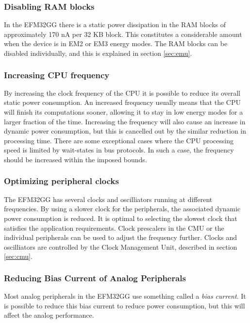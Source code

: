 \subsubsection{Disabling RAM blocks}
In the EFM32GG there is a static power dissipation in the RAM blocks of approximately 170 nA per 32 KB block. This constitutes a considerable amount when the device is in EM2 or EM3 energy modes. The RAM blocks can be disabled individually, and this is explained in section \ref{sec:emu}.\cite{efm32-energy-optimization}


\subsubsection{Increasing CPU frequency}
By increasing the clock frequency of the CPU it is possible to reduce its overall static power consumption. An increased frequency usually means that the CPU will finish its computations sooner, allowing it to stay in low energy modes for a larger fraction of the time. Increasing the frequency will also cause an increase in dynamic power consumption, but this is cancelled out by the similar reduction in processing time. There are some exceptional cases where the CPU processing speed is limited by wait-states in bus protocols. In such a case, the frequency should be increased within the imposed bounds.\cite{efm32-energy-optimization}


\subsubsection{Optimizing peripheral clocks}
The EFM32GG has several clocks and oscilliators running at different frequencies. By using a slower clock for the peripherals, the associated dynamic power consumption is reduced. It is optimal to selecting the slowest clock that satisfies the application requirements. Clock prescalers in the CMU or the individual peripherals can be used to adjust the frequency further. Clocks and oscilliators are controlled by the Clock Management Unit, described in section \ref{sec:cmu}.\cite{efm32-energy-optimization} 


\subsubsection{Reducing Bias Current of Analog Peripherals}
Most analog peripherals in the EFM32GG use something called a \emph{bias current}. It is possible to reduce this bias current to reduce power consumption, but this will affect the analog performance.\cite{efm32-energy-optimization}


